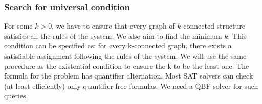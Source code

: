 \subsubsection{Search for universal condition}
%
For some $k>0$,
we have to ensure that every graph of $k$-connected structure satisfies all
the rules of the system.
%
We also aim to find the minimum $k$. 
%
This condition can be specified as: for every k-connected graph, there exists a satisfiable assignment following the rules of the system. 
%
%
We will use the same procedure as the existential condition to ensure the k to be the least one.
%
The formula for the problem has quantifier alternation. 
%
Most SAT solvers can check (at least efficiently) only quantifier-free formulas.
%
We need a QBF solver for such queries.
%
%
          

